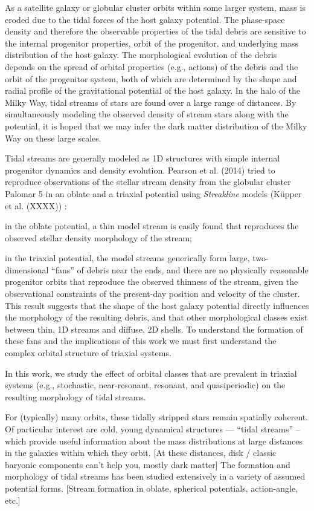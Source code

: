 \documentclass[letterpaper,12pt,preprint]{aastex}
\begin{document}
As a satellite galaxy or globular cluster orbits within some larger system, mass is eroded due to the tidal forces of the host galaxy potential. The phase-space density and therefore the observable properties of the tidal debris are sensitive to the internal progenitor properties, orbit of the progenitor, and underlying mass distribution of the host galaxy. The morphological evolution of the debris depends on the spread of orbital properties (e.g., actions) of the debris and the orbit of the progenitor system, both of which are determined by the shape and radial profile of the gravitational potential of the host galaxy. In the halo of the Milky Way, tidal streams of stars are found over a large range of distances. By simultaneously modeling the observed density of stream stars along with the potential, it is hoped that we may infer the dark matter distribution of the Milky Way on these large scales.

Tidal streams are generally modeled as 1D structures with simple internal progenitor dynamics and density evolution. 
Pearson et al. (2014) tried to reproduce observations of the stellar stream density from the globular cluster Palomar 5 in an oblate and a triaxial potential using \emph{Streakline} models (K\"upper et al. (XXXX)) : 
		\item in the oblate potential, a thin model stream is easily found that reproduces the observed stellar density morphology of the stream;
		\item in the triaxial potential, the model streams generically form large, two-dimensional ``fans'' of debris near the ends, and there are no physically reasonable progenitor orbits that reproduce the observed thinness of the stream, given the observational constraints of the present-day position and velocity of the cluster.
This result suggests that the shape of the host galaxy potential directly influences the morphology of the resulting debris, and that other morphological classes exist between thin, 1D streams and diffuse, 2D shells.
To understand the formation of these fans and the implications of this work we must first understand the complex orbital structure of triaxial systems.

In this work, we study the effect of orbital classes that are prevalent in triaxial systems (e.g., stochastic, near-resonant, resonant, and quasiperiodic) on the resulting morphology of tidal streams.


For (typically) many orbits, these tidally stripped stars remain spatially coherent.
Of particular interest are cold, young dynamical structures --- ``tidal streams'' -- which provide useful information about the mass distributions at large distances in the galaxies within which they orbit. [At these distances, disk / classic baryonic components can't help you, mostly dark matter]
The formation and morphology of tidal streams has been studied extensively in a variety of assumed potential forms. [Stream formation in oblate, spherical potentials, action-angle, etc.]
\end{document}
